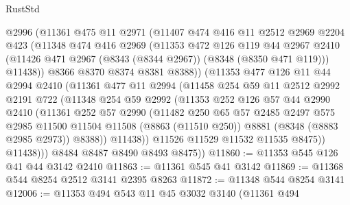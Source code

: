 \begin{lexlean}{RustStd}
\begin{coremodule}
            @2996
            (@11361
              @475
              @11
              @2971
              (@11407
                @474
                @416
                @11
                @2512
                @2969
                @2204
                @423
                (@11348
                  @474
                  @416
                  @2969
                  (@11353
                    @472
                    @126
                    @119
                    @44
                    @2967
                    @2410
                    (@11426 @471 @2967 (@8343 (@8344 @2967)) (@8348 (@8350 @471 @119)))
                    @11438))
                @8366
                @8370
                @8374
                @8381
                @8388))
            (@11353
              @477
              @126
              @11
              @44
              @2994
              @2410
              (@11361
                @477
                @11
                @2994
                (@11458
                  @254
                  @59
                  @11
                  @2512
                  @2992
                  @2191
                  @722
                  (@11348
                    @254
                    @59
                    @2992
                    (@11353
                      @252
                      @126
                      @57
                      @44
                      @2990
                      @2410
                      (@11361
                        @252
                        @57
                        @2990
                        (@11482
                          @250
                          @65
                          @57
                          @2485
                          @2497
                          @575
                          @2985
                          @11500
                          @11504
                          @11508
                          (@8863 (@11510 @250))
                          @8881
                          (@8348 (@8883 @2985 @2973))
                          @8388))
                      @11438))
                  @11526
                  @11529
                  @11532
                  @11535
                  @8475))
              @11438)))
        @8484
        @8487
        @8490
        @8493
        @8475))
@11860 := @11353 @545 @126 @41 @44 @3142 @2410
@11863 := @11361 @545 @41 @3142
@11869 := @11368 @544 @8254 @2512 @3141 @2395 @8263
@11872 := @11348 @544 @8254 @3141
@12006 := @11353
    @494
    @543
    @11
    @45
    @3032
    @3140
    (@11361
      @494

\end{coremodule}
\end{lexlean}
